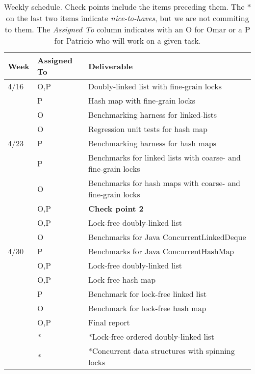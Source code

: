 \documentclass[11pt]{article}
\begin{document}
\begin{table}[t]
\begin{center}
\begin{tabular}{lll}
\toprule
\bf Week & \bf Assigned To  & \bf Deliverable   \\
\midrule
4/16     & O,P   & Doubly-linked list with fine-grain locks \\
         & P     & Hash map with fine-grain locks \\
         & O     & Benchmarking harness for linked-lists \\
         & O     & Regression unit tests for hash map \\
4/23     & P     & Benchmarking harness for hash maps \\
         & P     & Benchmarks for linked lists with coarse- and fine-grain locks \\
         & O     & Benchmarks for hash maps with coarse- and fine-grain locks \\
         & O,P   & {\bf Check point 2} \\
         & O,P   & Lock-free doubly-linked list \\
         & O     & Benchmarks for Java ConcurrentLinkedDeque \\
4/30     & P     & Benchmarks for Java ConcurrentHashMap \\
         & O,P   & Lock-free doubly-linked list \\
         & O,P   & Lock-free hash map \\
         & P     & Benchmark for lock-free linked list \\
         & O     & Benchmark for lock-free hash map \\
         & O,P   & Final report \\
         & *     & *Lock-free ordered doubly-linked list \\
         & *     & *Concurrent data structures with spinning locks \\
\bottomrule
\end{tabular}
\caption{
Weekly schedule. Check points include the items preceding them. The * on the
last two items indicate {\it nice-to-haves}, but we are not commiting to them.
The {\it Assigned To} column indicates with an O for Omar or a P for Patricio
who will work on a given task.
}
\label{table:sche}
\end{center}
\end{table}
\end{document}
